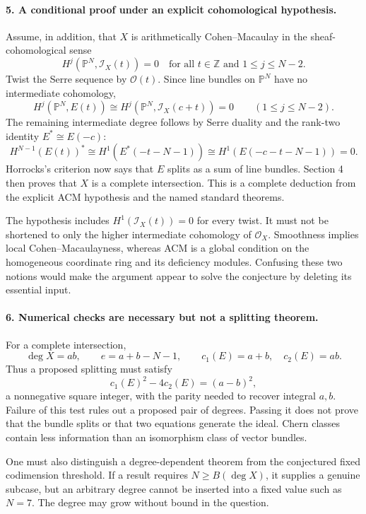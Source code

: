\documentclass[11pt]{article}
\begin{document}
\paragraph{5. A conditional proof under an explicit cohomological hypothesis.}
Assume, in addition, that $X$ is arithmetically Cohen--Macaulay in the sheaf-cohomological sense
\[
 H^j(\mathbb P^N,\mathcal I_X(t))=0
 \quad\text{for all }t\in\mathbb Z\text{ and }1\leq j\leq N-2.
\]
Twist the Serre sequence by $\mathcal O(t)$. Since line bundles on $\mathbb P^N$ have no intermediate cohomology,
\[
 H^j(\mathbb P^N,E(t))\cong
 H^j(\mathbb P^N,\mathcal I_X(c+t))=0
 \qquad(1\leq j\leq N-2).
\]
The remaining intermediate degree follows by Serre duality and the rank-two identity $E^*\cong E(-c)$:
\[
 H^{N-1}(E(t))^*\cong H^1(E^*(-t-N-1))
 \cong H^1(E(-c-t-N-1))=0.
\]
Horrocks's criterion now says that $E$ splits as a sum of line bundles. Section 4 then proves that $X$ is a complete intersection. This is a complete deduction from the explicit ACM hypothesis and the named standard theorems.

The hypothesis includes $H^1(\mathcal I_X(t))=0$ for every twist. It must not be shortened to only the higher intermediate cohomology of $\mathcal O_X$. Smoothness implies local Cohen--Macaulayness, whereas ACM is a global condition on the homogeneous coordinate ring and its deficiency modules. Confusing these two notions would make the argument appear to solve the conjecture by deleting its essential input.

\paragraph{6. Numerical checks are necessary but not a splitting theorem.}
For a complete intersection,
\[
 \deg X=ab,\qquad e=a+b-N-1,\qquad
 c_1(E)=a+b,\quad c_2(E)=ab.
\]
Thus a proposed splitting must satisfy
\[
 c_1(E)^2-4c_2(E)=(a-b)^2,
\]
a nonnegative square integer, with the parity needed to recover integral $a,b$. Failure of this test rules out a proposed pair of degrees. Passing it does not prove that the bundle splits or that two equations generate the ideal. Chern classes contain less information than an isomorphism class of vector bundles.

One must also distinguish a degree-dependent theorem from the conjectured fixed codimension threshold. If a result requires $N\geq B(\deg X)$, it supplies a genuine subcase, but an arbitrary degree cannot be inserted into a fixed value such as $N=7$. The degree may grow without bound in the question.
\end{document}
